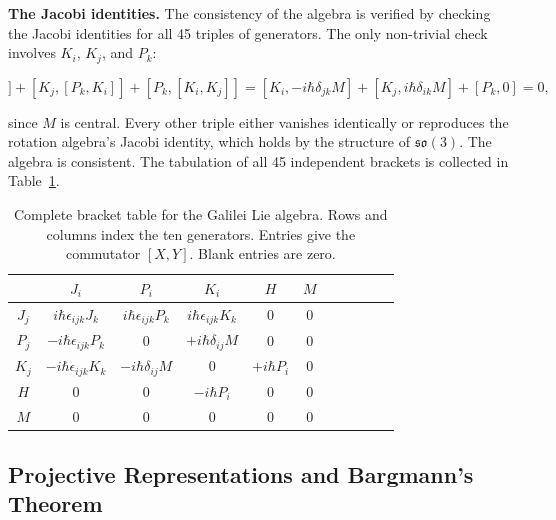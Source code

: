 \medskip\noindent\textbf{The Jacobi identities.} The consistency of the algebra is verified by checking the Jacobi identities for all 45 triples of generators. The only non-trivial check involves $K_i$, $K_j$, and $P_k$:
\begin{linenomath}
\begin{equation*}
[K_i,[K_j,P_k]] + [K_j,[P_k,K_i]] + [P_k,[K_i,K_j]]
= [K_i, -i\hbar\delta_{jk}M] + [K_j, i\hbar\delta_{ik}M] + [P_k, 0] = 0,
\end{equation*}
\end{linenomath}
since $M$ is central. Every other triple either vanishes identically or reproduces the rotation algebra's Jacobi identity, which holds by the structure of $\mathfrak{so}(3)$. The algebra is consistent. The tabulation of all 45 independent brackets is collected in Table~\ref{tab:galilei-brackets}.

\begin{table}[htbp]
\centering
\caption{Complete bracket table for the Galilei Lie algebra. Rows and columns index the ten generators. Entries give the commutator $[X,Y]$. Blank entries are zero.}
\label{tab:galilei-brackets}
\small
\begin{tabular}{c|cccccccccc}
& $J_i$ & $P_i$ & $K_i$ & $H$ & $M$ \\
\midrule
$J_j$ & $i\hbar\epsilon_{ijk}J_k$ & $i\hbar\epsilon_{ijk}P_k$ & $i\hbar\epsilon_{ijk}K_k$ & $0$ & $0$ \\
$P_j$ & $-i\hbar\epsilon_{ijk}P_k$ & $0$ & $+i\hbar\delta_{ij}M$ & $0$ & $0$ \\
$K_j$ & $-i\hbar\epsilon_{ijk}K_k$ & $-i\hbar\delta_{ij}M$ & $0$ & $+i\hbar P_i$ & $0$ \\
$H$ & $0$ & $0$ & $-i\hbar P_i$ & $0$ & $0$ \\
$M$ & $0$ & $0$ & $0$ & $0$ & $0$ \\
\end{tabular}
\end{table}

\subsection{Projective Representations and Bargmann's Theorem}
\label{sec:galilei-bargmann}

